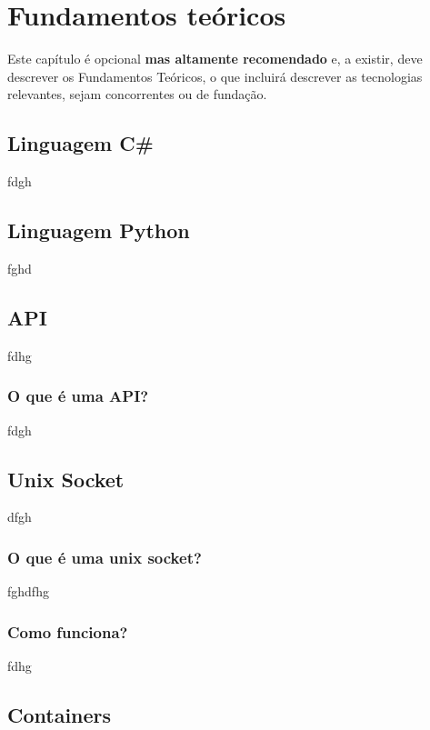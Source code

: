 \chapter{Fundamentos teóricos}
\label{chap:theo}

Este capítulo é opcional \textbf{mas altamente recomendado} e, a existir, deve descrever os Fundamentos Teóricos, o que incluirá descrever as tecnologias relevantes, sejam concorrentes ou de fundação.


\section{Linguagem C\#}

fdgh

\section{Linguagem Python}

fghd

\section{API}

fdhg

\subsection{O que é uma API?}

fdgh

\section{Unix Socket}

dfgh

\subsection{O que é uma unix socket?}

fghdfhg

\subsection{Como funciona?}

fdhg


\section{Containers}

